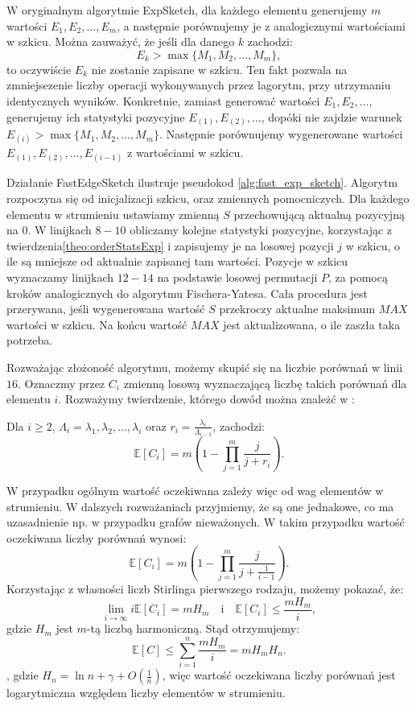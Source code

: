     W oryginalnym algorytmie ExpSketch, dla każdego elementu generujemy $m$ wartości $E_{1}, E_{2}, \dots, E_{m}$, a następnie porównujemy je z analogicznymi wartościami w szkicu. Można zauważyć, że jeśli dla danego $k$ zachodzi:
    \[
        E_{k} > \max{\{M_1, M_2, \dots, M_m\}},     
    \]
    to oczywiście $E_{k}$ nie zostanie zapisane w szkicu. Ten fakt pozwala na zmniejsezenie liczby operacji wykonywanych przez lagorytm, przy utrzymaniu identycznych wyników. Konkretnie, zamiast generować wartości $E_{1}, E_{2}, \dots$, generujemy ich statystyki pozycyjne $E_{(1)}, E_{(2)}, \dots$, dopóki nie zajdzie warunek $E_{(i)} > \max{\{M_1, M_2, \dots, M_m\}}$. Następnie porównujemy wygenerowane wartości $E_{(1)}, E_{(2)}, \dots, E_{(i - 1)}$ z wartościami w szkicu. 
    
    Działanie FastEdgeSketch ilustruje pseudokod \ref{alg:fast_exp_sketch}. Algorytm rozpoczyna się od inicjalizacji szkicu, oraz zmiennych pomocniczych. Dla każdego elementu w strumieniu ustawiamy zmienną $S$ przechowującą aktualną pozycyjną na $0$. W linijkach $8-10$ obliczamy kolejne statystyki pozycyjne, korzystając z twierdzenia\ref{theo:orderStatsExp} i zapisujemy je na losowej pozycji $j$ w szkicu, o ile są mniejsze od aktualnie zapisanej tam wartości. Pozycje w  szkicu wyznaczamy linijkach $12-14$ na podstawie losowej permutacji $P$, za pomocą kroków analogicznych do algorytmu Fischera-Yatesa. Cała procedura jest przerywana, jeśli wygenerowana wartość $S$ przekroczy aktualne maksimum $MAX$ wartości w szkicu. Na końcu wartość $MAX$ jest aktualizowana, o ile zaszła taka potrzeba.

    Rozważając złożoność algorytmu, możemy skupić się na liczbie porównań w linii $16$. Oznaczmy przez $C_i$ zmienną losową wyznaczającą liczbę takich porównań dla elementu $i$. Rozważymy twierdzenie, którego dowód można znależć w \cite{Lemiesz_2023}:
    \begin{twierdzenie}
        \label{theo:avgComp}        
        Dla $i \geq 2$, $\Lambda_{i} = \lambda_{1}, \lambda_{2}, \dots, \lambda_{i}$ oraz $r_i = \frac{\lambda_{i}}{\Lambda_{i - 1}}$, zachodzi:
        \[
            \mathbb{E}[C_i] = m \left( 1 - \prod_{j = 1}^{m} \frac{j}{j + r_i} \right).   
        \]
    \end{twierdzenie}
    W przypadku ogólnym wartość oczekiwana zależy więc od wag elementów w strumieniu. W dalszych rozważaniach przyjmiemy, że są one jednakowe, co ma uzasadnienie np. w przypadku grafów nieważonych. W takim przypadku wartość oczekiwana liczby porównań wynosi: 
    \[
        \mathbb{E}[C_i] = m \left( 1 - \prod_{j = 1}^{m} \frac{j}{j + \frac{1}{i - 1}} \right) .
    \]
    Korzystając z własności liczb Stirlinga pierwszego rodzaju, możemy pokazać, że:
    \[
        \lim_{i \to \infty} i \mathbb{E}[C_i] = m H_m \quad \text{i} \quad \mathbb{E}[C_i] \leq \frac{m H_m}{i},
    \]
    gdzie $H_m$ jest $m$-tą liczbą harmoniczną. Stąd otrzymujemy:
    \[
        \mathbb{E}[C] \leq \sum\limits_{i = 1}^{n} \frac{m H_m}{i} = m H_m H_n.
    \], gdzie $H_n = \ln n + \gamma + O(\frac{1}{n})$, więc wartość oczekiwana liczby porównań jest logarytmiczna względem liczby elementów w strumieniu.

